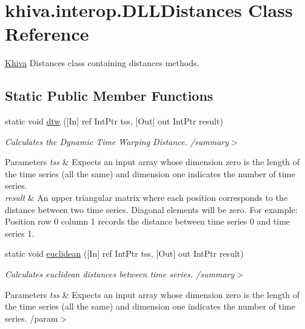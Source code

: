 \hypertarget{classkhiva_1_1interop_1_1_d_l_l_distances}{}\section{khiva.\+interop.\+D\+L\+L\+Distances Class Reference}
\label{classkhiva_1_1interop_1_1_d_l_l_distances}


\mbox{\hyperlink{classkhiva_1_1_khiva}{Khiva}} Distances class containing distances methods.  


\subsection*{Static Public Member Functions}
\begin{DoxyCompactItemize}
\item 
static void \mbox{\hyperlink{classkhiva_1_1interop_1_1_d_l_l_distances_a00c1906d6308f864e2034743c6e1c3c6}{dtw}} (\mbox{[}In\mbox{]} ref Int\+Ptr tss, \mbox{[}Out\mbox{]} out Int\+Ptr result)
\begin{DoxyCompactList}\small\item\em Calculates the Dynamic Time Warping Distance. /summary$>$ 
\begin{DoxyParams}{Parameters}
{\em tss} & Expects an input array whose dimension zero is the length of the time series (all the same) and dimension one indicates the number of time series.\\
\hline
{\em result} & An upper triangular matrix where each position corresponds to the distance between two time series. Diagonal elements will be zero. For example\+: Position row 0 column 1 records the distance between time series 0 and time series 1.\\
\hline
\end{DoxyParams}
\end{DoxyCompactList}\item 
static void \mbox{\hyperlink{classkhiva_1_1interop_1_1_d_l_l_distances_aa869f8c6d5c45991db203eaf91dfa918}{euclidean}} (\mbox{[}In\mbox{]} ref Int\+Ptr tss, \mbox{[}Out\mbox{]} out Int\+Ptr result)
\begin{DoxyCompactList}\small\item\em Calculates euclidean distances between time series. /summary$>$ 
\begin{DoxyParams}{Parameters}
{\em tss} & Expects an input array whose dimension zero is the length of the time series (all the same) and dimension one indicates the number of time series. /param$>$ 

\end{DoxyParams}
\end{DoxyCompactList}
\end{DoxyCompactItemize}
